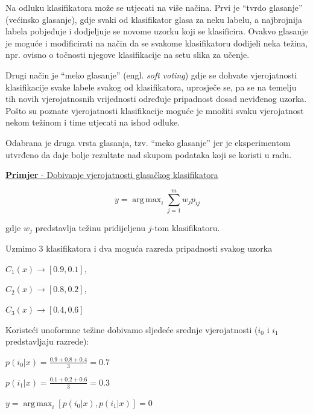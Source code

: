 \documentclass[times, utf8, zavrsni]{fer}
\DeclareMathOperator*{\argmax}{arg\,max}
\begin{document}
\bigbreak

Na odluku klasifikatora može se utjecati
na više načina. Prvi je \enquote{tvrdo glasanje} (većinsko glasanje), gdje
svaki od klasifikator glasa za neku labelu, a najbrojnija labela pobjeđuje 
i dodjeljuje se novome uzorku koji se klasificira. Ovakvo glasanje je moguće i 
modificirati na način da se svakome klasifikatoru dodijeli neka težina, 
npr. ovisno o točnosti njegove klasifikacije na setu slika za učenje.

\bigbreak

Drugi način je \enquote{meko glasanje} (engl. \textit{soft voting}) gdje
se dohvate vjerojatnosti klasifikacije svake labele svakog od klasifikatora,
uprosječe se, pa se na temelju tih novih vjerojatnosnih vrijednosti određuje
pripadnost dosad neviđenog uzorka. Pošto su poznate vjerojatnosti klasifikacije
moguće je množiti svaku vjerojatnost nekom težinom i time utjecati na ishod odluke.

\bigbreak

Odabrana je druga vrsta glasanja, tzv. \enquote{meko glasanje} jer je eksperimentom
utvrđeno da daje bolje rezultate nad skupom podataka koji se koristi u radu.  

\newpage

\underline{\textbf{Primjer} - Dobivanje vjerojatnosti glasačkog klasifikatora}

\[y = \argmax_i \sum_{j=1}^mw_jp_{ij}\]

gdje \(w_j\) predstavlja težinu pridijeljenu \(j\)-tom klasifikatoru.

\bigbreak

Uzmimo 3 klasifikatora i dva moguća razreda pripadnosti svakog uzorka 

\begin{center}
\(C_1(x) \rightarrow [0.9,0.1]\),
\end{center}
\begin{center}
\(C_2(x) \rightarrow [0.8,0.2]\),
\end{center}
\begin{center}
\(C_3(x) \rightarrow [0.4,0.6]\)
\end{center}

Koristeći unoformne težine dobivamo sljedeće srednje vjerojatnosti (\(i_0\) i \(i_1\) predstavljaju razrede):
\begin{center}
\(p(i_0|x)=\frac{0.9+0.8+0.4}{3}=0.7\)

\(p(i_1|x)=\frac{0.1+0.2+0.6}{3}=0.3\)

\(y=\argmax_i [p(i_0|x),p(i_1|x)]=0\)
\end{center}
\end{document}
